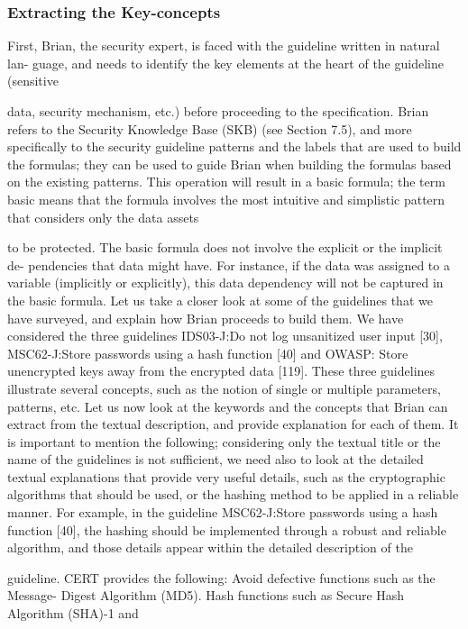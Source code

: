 \documentclass[10pt]{article}
\begin{document}
\subsubsection{Extracting the Key-concepts}
First, Brian, the security expert, is faced with the guideline written in natural lan-
guage, and needs to identify the key elements at the heart of the guideline (sensitive

data, security mechanism, etc.) before proceeding to the specification. Brian refers
to the Security Knowledge Base (SKB) (see Section 7.5), and more specifically to the
security guideline patterns and the labels that are used to build the formulas; they
can be used to guide Brian when building the formulas based on the existing patterns.
This operation will result in a basic formula; the term basic means that the formula
involves the most intuitive and simplistic pattern that considers only the data assets

to be protected. The basic formula does not involve the explicit or the implicit de-
pendencies that data might have. For instance, if the data was assigned to a variable (implicitly or explicitly), this data dependency will not be captured in the basic formula.
Let us take a closer look at some of the guidelines that we have surveyed, and explain
how Brian proceeds to build them. We have considered the three guidelines IDS03-J:Do
not log unsanitized user input [30], MSC62-J:Store passwords using a hash
function [40] and OWASP: Store unencrypted keys away from the encrypted
data [119]. These three guidelines illustrate several concepts, such as the notion of
single or multiple parameters, patterns, etc.
Let us now look at the keywords and the concepts that Brian can extract from the textual
description, and provide explanation for each of them. It is important to mention the
following; considering only the textual title or the name of the guidelines is not sufficient,
we need also to look at the detailed textual explanations that provide very useful details,
such as the cryptographic algorithms that should be used, or the hashing method to be
applied in a reliable manner. For example, in the guideline MSC62-J:Store passwords
using a hash function [40], the hashing should be implemented through a robust
and reliable algorithm, and those details appear within the detailed description of the

guideline. CERT provides the following: Avoid defective functions such as the Message-
Digest Algorithm (MD5). Hash functions such as Secure Hash Algorithm (SHA)-1 and
\end{document}
